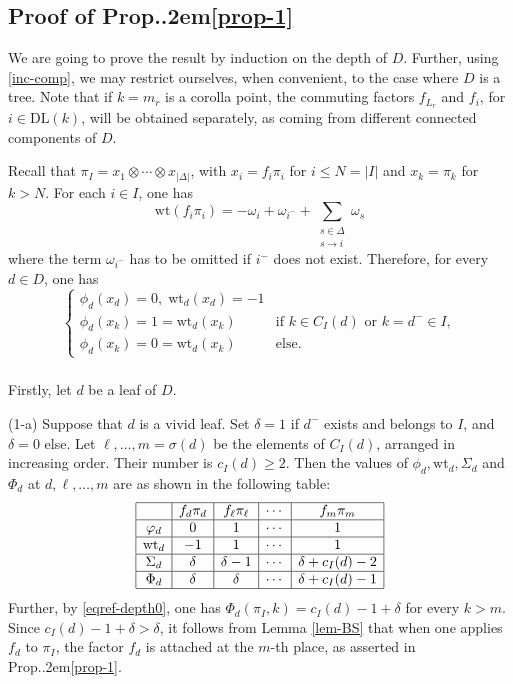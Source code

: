 \documentclass[12pt]{amsart}
\numberwithin{equation}{section}
\theoremstyle{definition}
\def\Prop{Prop.\kern.2em}
\def\DL{\mathrm{DL}}  %
\def\wt{\mathrm{wt}}  %
\begin{document}
\subsection{Proof of \Prop  \ref{prop-1}} We are going to prove the result by induction on the depth of 
$D$. Further, using \eqref{inc-comp}, we may restrict ourselves, when convenient, to the case where $D$ is 
a tree. Note that if $k = m_r$ is a corolla point, the commuting factors $f_{L_r}$ and $f_i$, for $i\in \DL(k)$, will 
be obtained separately, as coming from different connected components of $D$. 

\smallskip Recall that $\pi_I = x_1 \otimes \cdots \otimes x_{\vert \Delta\vert}$, with $x_i = f_i \pi_i$ 
for $i \leq N = \vert I \vert$ and $x_k = \pi_k$ for $k> N$. For each $i\in I$, one has 
\begin{equation} 
\wt(f_i \pi_i) = -\omega_i + \omega_{i^-} + \sum_{\substack{s\in \Delta\\ s\to i}} \omega_s
\end{equation} 
where the term $\omega_{i^-}$ has to be omitted if $i^-$ does not exist. Therefore, for every $d\in D$, one has 
\begin{equation}\label{eqref-depth0} 
\begin{cases} 
\phi_d(x_d) = 0, \; \wt_d(x_d) = -1 & 
\\
\phi_d(x_k) = 1 = \wt_d(x_k) & \text{if $k \in C_I(d)$ or } k = d^- \in I , 
\\
\phi_d(x_k) = 0 = \wt_d(x_k) & \text{else}. 
\end{cases} 
\end{equation} 

\subsubsection{}\label{subsub-depth0} Firstly, let $d$ be a leaf of $D$. 

\smallskip (1-a) Suppose that $d$ is a vivid leaf. Set $\delta = 1$ if $d^-$ exists and belongs to $I$, and 
$\delta = 0$ else. Let $\ell, \dots, m = \sigma(d)$ be the elements of $C_I(d)$, arranged in increasing order. 
Their number is $c_I(d) \geq 2$. 
Then the values of $\phi_d, \wt_d, \Sigma_d$ and $\Phi_d$ at $d, \ell, \dots, m$ are as shown in 
the following table:  
$$
\begin{array}{|c|c|c|c|c|c|}
\hline 
 & f_d \pi_d & f_\ell \pi_\ell & \cdots & f_m \pi_m   
\\
\hline 
\varphi_d & 0 & 1 & \cdots & 1 
\\
\hline 
\wt_d & -1 & 1 & \cdots & 1 
\\
\hline 
\Sigma_d & \delta & \delta- 1 & \cdots & \delta + c_I(d)  - 2  
\\
\hline 
\Phi_d & \delta & \delta & \cdots & \delta + c_I(d)  - 1  
\\
\hline
\end{array}
$$
Further, by \eqref{eqref-depth0}, one has $\Phi_d(\pi_I,k) = c_I(d) - 1 + \delta$ for every $k > m$. 
Since $c_I(d) - 1 + \delta > \delta$, it follows from Lemma \ref{lem-BS} that when one applies 
$f_d$ to $\pi_I$, the factor $f_d$ is attached at the $m$-th place, as asserted in \Prop \ref{prop-1}.  
\end{document}
